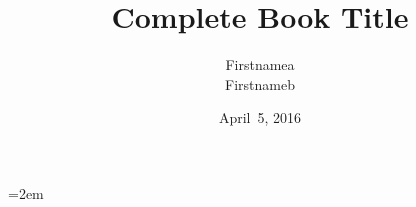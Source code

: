 \documentclass[treatise,english,allpages]{ouvrage-hermes}[2005/11/14]
\title[%
Shortened Book Title]{%
Complete Book Title}
\author{%
Firstnamea \Name{Lastnamea}\\
Firstnameb \Name{Lastnameb}}
\date{%
April~5, 2016}
\begin{document}
\emergencystretch=2em

\frontmatter

\maketitle
%
\tableofcontents
%
%

\mainmatter


%

%

\backmatter

\iftreatise
 
\else
 \nocite{*}
 
\fi
\printindex
\end{document}
